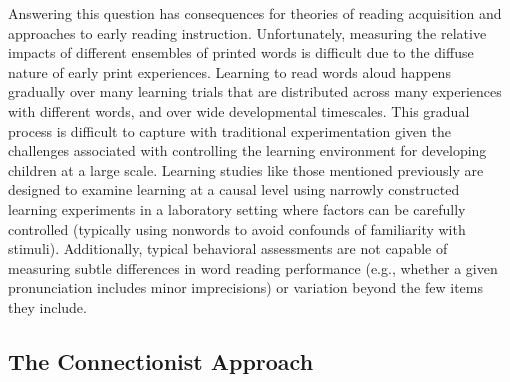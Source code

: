\documentclass[
  ,man,floatsintext]{apa6}
\begin{document}
Answering this question has consequences for theories of reading acquisition and approaches to early reading instruction. Unfortunately, measuring the relative impacts of different ensembles of printed words is difficult due to the diffuse nature of early print experiences. Learning to read words aloud happens gradually over many learning trials that are distributed across many experiences with different words, and over wide developmental timescales. This gradual process is difficult to capture with traditional experimentation given the challenges associated with controlling the learning environment for developing children at a large scale. Learning studies like those mentioned previously are designed to examine learning at a causal level using narrowly constructed learning experiments in a laboratory setting where factors can be carefully controlled (typically using nonwords to avoid confounds of familiarity with stimuli). Additionally, typical behavioral assessments are not capable of measuring subtle differences in word reading performance (e.g., whether a given pronunciation includes minor imprecisions) or variation beyond the few items they include.

\subsection{The Connectionist Approach}\label{the-connectionist-approach}
\end{document}
